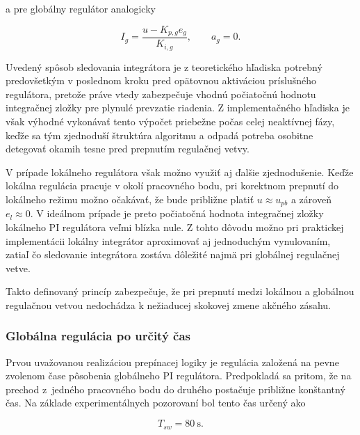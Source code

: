 a pre globálny regulátor analogicky

\begin{equation}
I_g = \frac{u - K_{p,g} e_g}{K_{i,g}},
\qquad a_g = 0.
\label{eq:pi_switch_global_tracking}
\end{equation}

Uvedený spôsob sledovania integrátora je z teoretického hľadiska potrebný
predovšetkým v poslednom kroku pred opätovnou aktiváciou príslušného
regulátora, pretože práve vtedy zabezpečuje vhodnú počiatočnú hodnotu
integračnej zložky pre plynulé prevzatie riadenia. Z implementačného hľadiska
je však výhodné vykonávať tento výpočet priebežne počas celej neaktívnej fázy,
keďže sa tým zjednoduší štruktúra algoritmu a odpadá potreba osobitne
detegovať okamih tesne pred prepnutím regulačnej vetvy.

V prípade lokálneho regulátora však možno využiť aj ďalšie zjednodušenie.
Keďže lokálna regulácia pracuje v okolí pracovného bodu, pri korektnom
prepnutí do lokálneho režimu možno očakávať, že bude približne platiť
$u \approx u_{pb}$ a zároveň $e_l \approx 0$. V ideálnom prípade je preto
počiatočná hodnota integračnej zložky lokálneho PI regulátora veľmi blízka
nule. Z tohto dôvodu možno pri praktickej implementácii lokálny integrátor
aproximovať aj jednoduchým vynulovaním, zatiaľ čo sledovanie integrátora
zostáva dôležité najmä pri globálnej regulačnej vetve.

Takto definovaný princíp zabezpečuje, že pri prepnutí medzi lokálnou
a globálnou regulačnou vetvou nedochádza k nežiaducej skokovej zmene
akčného zásahu.


\subsubsection{Globálna regulácia po určitý čas}
\label{sec:pi_switch_timer_based}

Prvou uvažovanou realizáciou prepínacej logiky
je regulácia založená na pevne zvolenom čase pôsobenia globálneho PI regulátora.
Predpokladá sa pritom,
že na prechod z~jedného pracovného bodu do druhého
postačuje približne konštantný čas.
Na základe experimentálnych pozorovaní
bol tento čas určený ako

\begin{equation}
T_{sw} = 80~\mathrm{s}.
\label{eq:pi_switch_timer}
\end{equation}

